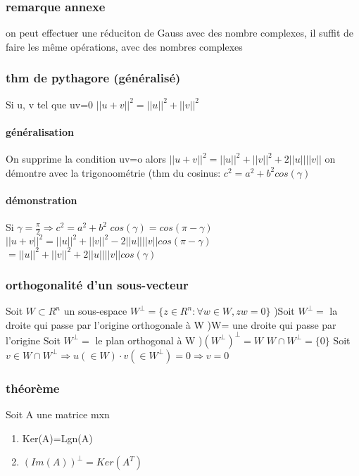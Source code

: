 \documentclass[a4paper,10pt]{article}
\begin{document}
\subsubsection{remarque annexe}
on peut effectuer une réduciton de Gauss avec des nombre complexes, il suffit de faire les même opérations, avec des nombres complexes
\subsubsection{thm de pythagore (généralisé) }
Si u, v tel que uv=0
\newline
$||u+v||^2=||u||^2+||v||^2$
\paragraph{généralisation}
On supprime la condition uv=o
\newline
alors $||u+v||^2=||u||^2+||v||^2+2||u||||v||$
\newline
on démontre avec la trigonoométrie (thm du cosinus: $c^2=a^2+b^2cos(\gamma)$
\paragraph{démonstration}
Si $\gamma=\frac{\pi}{2}\Rightarrow c^2=a^2+b^2$
\newline
$cos(\gamma)=cos(\pi-\gamma)$
\newline
$||u+v||^2=||u||^2+||v||^2-2||u||||v||cos(\pi-\gamma)$
\newline
$=||u||^2+||v||^2+2||u||||v||cos(\gamma)$
\subsubsection{orthogonalité d'un sous-vecteur}
Soit $W\subset R^n$ un sous-espace
\newline
$W^{\bot}=\{z\in R^n:\forall w\in W,zw=0\}$
)Soit $W^{\bot}=$ la droite qui passe par l'origine orthogonale à W
)W= une droite qui passe par l'origine
\newline
Soit $W^{\bot}=$ le plan orthogonal à W
)$(W^{\bot})^{\bot}=W$
\newline
$W\cap W^{\bot}=\{0\}$
\newline
Soit $v\in W\cap W^{\bot}\Rightarrow u(\in W)\cdot v(\in W^{\bot})=0\Rightarrow v=0$
\subsubsection{théorème}
Soit A une matrice mxn
\begin{enumerate}
 \item Ker(A)=Lgn(A)
 \item $(Im(A))^{\bot}=Ker(A^T)$
\end{enumerate}
\end{document}
